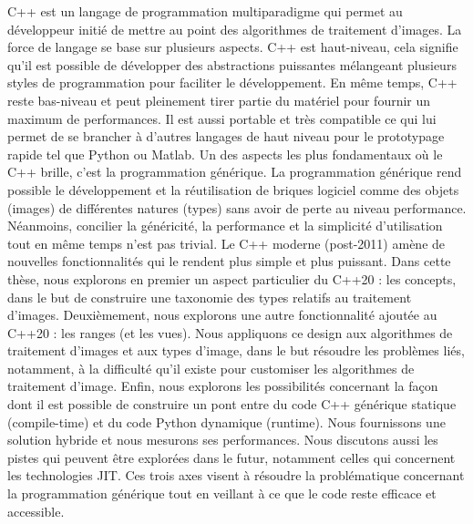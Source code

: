 \noindent C++ est un langage de programmation multiparadigme qui permet au développeur initié de mettre au point des
algorithmes de traitement d'images. La force de langage se base sur plusieurs aspects. C++ est haut-niveau, cela
signifie qu'il est possible de développer des abstractions puissantes mélangeant plusieurs styles de programmation pour
faciliter le développement. En même temps, C++ reste bas-niveau et peut pleinement tirer partie du matériel pour fournir
un maximum de performances. Il est aussi portable et très compatible ce qui lui permet de se brancher à d'autres
langages de haut niveau pour le prototypage rapide tel que Python ou Matlab. Un des aspects les plus fondamentaux où le
C++ brille, c'est la programmation générique. La programmation générique rend possible le développement et la
réutilisation de briques logiciel comme des objets (images) de différentes natures (types) sans avoir de perte au niveau
performance. Néanmoins, concilier la généricité, la performance et la simplicité d'utilisation tout en même temps n'est
pas trivial. Le C++ moderne (post-2011) amène de nouvelles fonctionnalités qui le rendent plus simple et plus puissant.
Dans cette thèse, nous explorons en premier un aspect particulier du C++20 : les concepts, dans le but de construire une
taxonomie des types relatifs au traitement d'images. Deuxièmement, nous explorons une autre fonctionnalité ajoutée au
C++20 : les ranges (et les vues). Nous appliquons ce design aux algorithmes de traitement d'images et aux types d'image,
dans le but résoudre les problèmes liés, notamment, à la difficulté qu'il existe pour customiser les algorithmes de
traitement d'image. Enfin, nous explorons les possibilités concernant la façon dont il est possible de construire un
pont entre du code C++ générique statique (compile-time) et du code Python dynamique (runtime). Nous fournissons une
solution hybride et nous mesurons ses performances. Nous discutons aussi les pistes qui peuvent être explorées dans le
futur, notamment celles qui concernent les technologies JIT. Ces trois axes visent à résoudre la problématique
concernant la programmation générique tout en veillant à ce que le code reste efficace et accessible.
